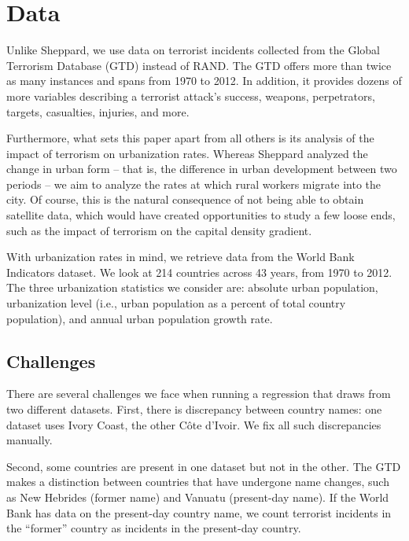 \documentclass[preprint,2p,12pt]{elsarticle}
\begin{document}
\section{\sc Data}
Unlike Sheppard, we use data on terrorist incidents collected from the Global Terrorism Database (GTD) instead of RAND.
The GTD offers more than twice as many instances and spans from 1970 to 2012.
In addition, it provides dozens of more variables describing a terrorist attack's success, weapons, perpetrators, targets, casualties, injuries, and more.

Furthermore, what sets this paper apart from all others is its analysis of the impact of terrorism on urbanization rates.
Whereas Sheppard analyzed the change in urban form -- that is, the difference in urban development between two periods -- we aim to analyze the rates at which rural workers migrate into the city.
Of course, this is the natural consequence of not being able to obtain satellite data, which would have created opportunities to study a few loose ends, such as the impact of terrorism on the capital density gradient. 

With urbanization rates in mind, we retrieve data from the World Bank Indicators dataset.
We look at 214 countries across 43 years, from 1970 to 2012.
The three urbanization statistics we consider are: absolute urban population, urbanization level (i.e., urban population as a percent of total country population), and annual urban population growth rate.

\subsection{Challenges}
There are several challenges we face when running a regression that draws from two different datasets.
First, there is discrepancy between country names: one dataset uses Ivory Coast, the other C\^{o}te d'Ivoir.
We fix all such discrepancies manually.

Second, some countries are present in one dataset but not in the other. 
The GTD makes a distinction between countries that have undergone name changes, such as New Hebrides (former name) and Vanuatu (present-day name).
If the World Bank has data on the present-day country name, we count terrorist incidents in the ``former'' country as incidents in the present-day country.
\end{document}
